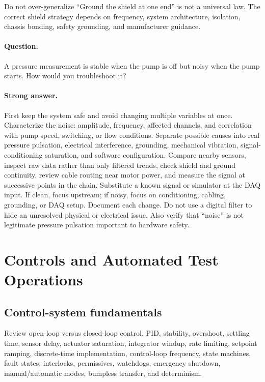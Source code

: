 \documentclass[11pt]{article}
\newcommand{\q}[1]{\paragraph{Question.} #1}
\newcommand{\ans}[1]{\paragraph{Strong answer.} #1}
\begin{document}
\begin{warningbox}{Do not over-generalize}
``Ground the shield at one end'' is not a universal law. The correct shield
strategy depends on frequency, system architecture, isolation, chassis bonding,
safety grounding, and manufacturer guidance.
\end{warningbox}

\q{A pressure measurement is stable when the pump is off but noisy when the pump starts. How would you troubleshoot it?}
\ans{First keep the system safe and avoid changing multiple variables at once.
Characterize the noise: amplitude, frequency, affected channels, and correlation
with pump speed, switching, or flow conditions. Separate possible causes into
real pressure pulsation, electrical interference, grounding, mechanical
vibration, signal-conditioning saturation, and software configuration. Compare
nearby sensors, inspect raw data rather than only filtered trends, check shield
and ground continuity, review cable routing near motor power, and measure the
signal at successive points in the chain. Substitute a known signal or simulator
at the DAQ input. If clean, focus upstream; if noisy, focus on conditioning,
cabling, grounding, or DAQ setup. Document each change. Do not use a digital
filter to hide an unresolved physical or electrical issue. Also verify that
``noise'' is not legitimate pressure pulsation important to hardware safety.}

\section{Controls and Automated Test Operations}

\subsection{Control-system fundamentals}
Review open-loop versus closed-loop control, PID, stability, overshoot, settling
time, sensor delay, actuator saturation, integrator windup, rate limiting,
setpoint ramping, discrete-time implementation, control-loop frequency, state
machines, fault states, interlocks, permissives, watchdogs, emergency shutdown,
manual/automatic modes, bumpless transfer, and determinism.
\end{document}
